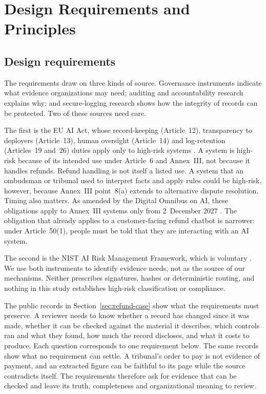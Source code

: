 \documentclass[11pt]{article}
\begin{document}
\section{Design Requirements and Principles}\label{sec:requirements}

\subsection{Design requirements}

The requirements draw on three kinds of source. Governance instruments indicate what evidence organizations may need; auditing and accountability research explains why; and secure-logging research shows how the integrity of records can be protected. Two of these sources need care.

The first is the EU AI Act, whose record-keeping (Article~12), transparency to deployers (Article~13), human oversight (Article~14) and log-retention (Articles~19 and~26) duties apply only to high-risk systems \citep{euai2026text}. A system is high-risk because of its intended use under Article~6 and Annex~III, not because it handles refunds. Refund handling is not itself a listed use. A system that an ombudsman or tribunal used to interpret facts and apply rules could be high-risk, however, because Annex~III point~8(a) extends to alternative dispute resolution. Timing also matters. As amended by the Digital Omnibus on AI, these obligations apply to Annex~III systems only from 2~December 2027 \citep[Art.~113]{euai2026text}. The obligation that already applies to a customer-facing refund chatbot is narrower: under Article~50(1), people must be told that they are interacting with an AI system.

The second is the NIST AI Risk Management Framework, which is voluntary \citep[p.~2]{nist2023}. We use both instruments to identify evidence needs, not as the source of our mechanisms. Neither prescribes signatures, hashes or deterministic routing, and nothing in this study establishes high-risk classification or compliance.

The public records in Section~\ref{sec:refund-case} show what the requirements must preserve. A reviewer needs to know whether a record has changed since it was made, whether it can be checked against the material it describes, which controls ran and what they found, how much the record discloses, and what it costs to produce. Each question corresponds to one requirement below. The same records show what no requirement can settle. A tribunal's order to pay is not evidence of payment, and an extracted figure can be faithful to its page while the source contradicts itself. The requirements therefore ask for evidence that can be checked and leave its truth, completeness and organizational meaning to review.
\end{document}
